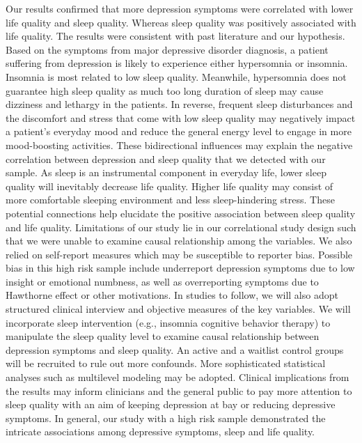 \documentclass[man, noextraspace]{apa6}
\theoremstyle{definition}
\theoremstyle{definition}
\theoremstyle{definition}
\theoremstyle{remark}
\begin{document}
Our results confirmed that more depression symptoms were correlated with
lower life quality and sleep quality. Whereas sleep quality was
positively associated with life quality. The results were consistent
with past literature and our hypothesis. Based on the symptoms from
major depressive disorder diagnosis, a patient suffering from depression
is likely to experience either hypersomnia or insomnia. Insomnia is most
related to low sleep quality. Meanwhile, hypersomnia does not guarantee
high sleep quality as much too long duration of sleep may cause
dizziness and lethargy in the patients. In reverse, frequent sleep
disturbances and the discomfort and stress that come with low sleep
quality may negatively impact a patient's everyday mood and reduce the
general energy level to engage in more mood-boosting activities. These
bidirectional influences may explain the negative correlation between
depression and sleep quality that we detected with our sample. As sleep
is an instrumental component in everyday life, lower sleep quality will
inevitably decrease life quality. Higher life quality may consist of
more comfortable sleeping environment and less sleep-hindering stress.
These potential connections help elucidate the positive association
between sleep quality and life quality. Limitations of our study lie in
our correlational study design such that we were unable to examine
causal relationship among the variables. We also relied on self-report
measures which may be susceptible to reporter bias. Possible bias in
this high risk sample include underreport depression symptoms due to low
insight or emotional numbness, as well as overreporting symptoms due to
Hawthorne effect or other motivations. In studies to follow, we will
also adopt structured clinical interview and objective measures of the
key variables. We will incorporate sleep intervention (e.g., insomnia
cognitive behavior therapy) to manipulate the sleep quality level to
examine causal relationship between depression symptoms and sleep
quality. An active and a waitlist control groups will be recruited to
rule out more confounds. More sophisticated statistical analyses such as
multilevel modeling may be adopted. Clinical implications from the
results may inform clinicians and the general public to pay more
attention to sleep quality with an aim of keeping depression at bay or
reducing depressive symptoms. In general, our study with a high risk
sample demonstrated the intricate associations among depressive
symptoms, sleep and life quality.

\newpage
\end{document}
